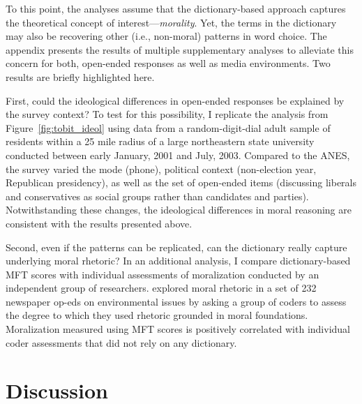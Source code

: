 \documentclass[12pt]{article}
\begin{document}
To this point, the analyses assume that the dictionary-based approach captures the theoretical concept of interest---\textit{morality}. Yet, the terms in the dictionary may also be recovering other (i.e., non-moral) patterns in word choice. The appendix presents the results of multiple supplementary analyses to alleviate this concern for both, open-ended responses as well as media environments. Two results are briefly highlighted here.

First, could the ideological differences in open-ended responses be explained by the survey context? To test for this possibility, I replicate the analysis from Figure~\ref{fig:tobit_ideol} using data from a random-digit-dial adult sample of residents within a 25 mile radius of a large northeastern state university conducted between early January, 2001 and July, 2003. Compared to the ANES, the survey varied the mode (phone), political context (non-election year, Republican presidency), as well as the set of open-ended items (discussing liberals and conservatives as social groups rather than candidates and parties). Notwithstanding these changes, the ideological differences in moral reasoning are consistent with the results presented above.

Second, even if the patterns can be replicated, can the dictionary really capture underlying moral rhetoric? In an additional analysis, I compare dictionary-based MFT scores with individual assessments of moralization conducted by an independent group of researchers. \citet{feinberg2013moral} explored moral rhetoric in a set of 232 newspaper op-eds on environmental issues by asking a group of coders to assess the degree to which they used rhetoric grounded in moral foundations. Moralization measured using MFT scores is positively correlated with individual coder assessments that did not rely on any dictionary.


\section*{Discussion}

\end{document}
